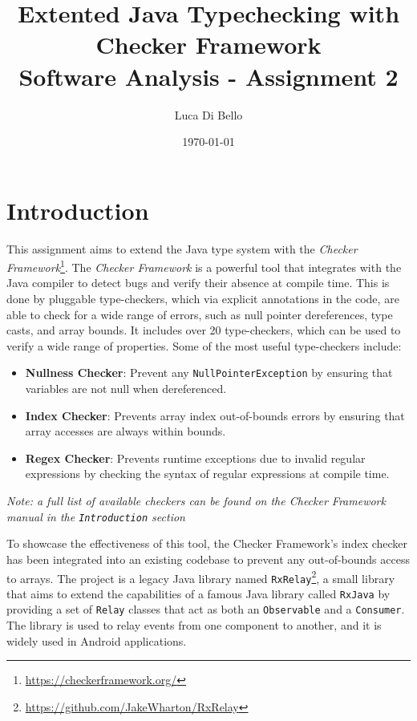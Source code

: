 \documentclass[a4paper, 11pt]{article}
\title{Extented Java Typechecking with Checker Framework \\[1ex] \large Software Analysis - Assignment 2}
\author{Luca Di Bello}
\date{\today}
\begin{document}
\maketitle
\tableofcontents

\section{Introduction}

This assignment aims to extend the Java type system with the \textit{Checker Framework}\footnote{\url{https://checkerframework.org/}}. The \textit{Checker Framework} is a powerful tool that integrates with the Java compiler to detect bugs and verify their absence at compile time. This is done by pluggable type-checkers, which via explicit annotations in the code, are able to check for a wide range of errors, such as null pointer dereferences, type casts, and array bounds.  It includes over 20 type-checkers, which can be used to verify a wide range of properties. Some of the most useful type-checkers include:

\begin{itemize}
    \item \textbf{Nullness Checker}: Prevent any \texttt{NullPointerException} by ensuring that variables are not null when dereferenced.
    \item \textbf{Index Checker}: Prevents array index out-of-bounds errors by ensuring that array accesses are always within bounds.
    \item \textbf{Regex Checker}: Prevents runtime exceptions due to invalid regular expressions by checking the syntax of regular expressions at compile time.
\end{itemize}

\textit{Note: a full list of available checkers can be found on the Checker Framework manual in the \texttt{Introduction} section}

\pagebreak

\noindent To showcase the effectiveness of this tool, the Checker Framework's index checker has been integrated into an existing codebase to prevent any out-of-bounds access to arrays. The project is a legacy Java library named \texttt{RxRelay}\footnote{\url{https://github.com/JakeWharton/RxRelay}}, a small library that aims to extend the capabilities of a famous Java library called \texttt{RxJava} by providing a set of \texttt{Relay} classes that act as both an \texttt{Observable} and a \texttt{Consumer}. The library is used to relay events from one component to another, and it is widely used in Android applications. \cite{rxrelay:readme}
\end{document}
